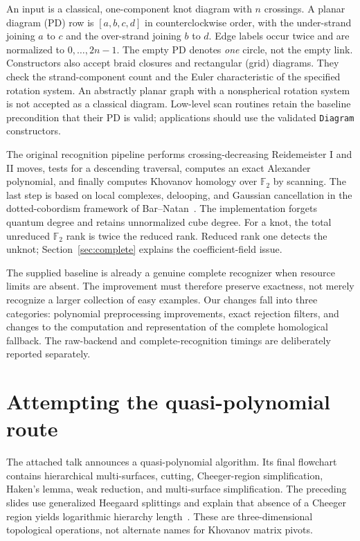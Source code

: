 \documentclass[11pt]{article}
\theoremstyle{definition}\newtheorem{definition}[theorem]{Definition}
\theoremstyle{remark}\newtheorem{remark}[theorem]{Remark}
\newcommand{\F}{\mathbb F_2}
\begin{document}
An input is a classical, one-component knot diagram with $n$ crossings. A planar
diagram (PD) row is $[a,b,c,d]$ in counterclockwise order, with the under-strand
joining $a$ to $c$ and the over-strand joining $b$ to $d$. Edge labels occur twice
and are normalized to $0,\ldots,2n-1$. The empty PD denotes \emph{one} circle,
not the empty link. Constructors also accept braid closures and rectangular
(grid) diagrams. They check the strand-component count and the Euler
characteristic of the specified rotation system. An abstractly planar graph
with a nonspherical rotation system is not accepted as a classical diagram.
Low-level scan routines retain the baseline precondition that their PD is valid;
applications should use the validated \texttt{Diagram} constructors.

The original recognition pipeline performs crossing-decreasing Reidemeister I
and II moves, tests for a descending traversal, computes an exact Alexander
polynomial, and finally computes Khovanov homology over $\F$ by scanning. The
last step is based on local complexes, delooping, and Gaussian cancellation in
the dotted-cobordism framework of Bar--Natan~\cite{BN}. The implementation forgets
quantum degree and retains unnormalized cube degree. For a knot, the total
unreduced $\F$ rank is twice the reduced rank. Reduced rank one detects the
unknot; Section~\ref{sec:complete} explains the coefficient-field issue.

The supplied baseline is already a genuine complete recognizer when resource
limits are absent. The improvement must therefore preserve exactness, not merely
recognize a larger collection of easy examples. Our changes fall into three
categories: polynomial preprocessing improvements, exact rejection filters, and
changes to the computation and representation of the complete homological
fallback. The raw-backend and complete-recognition timings are deliberately
reported separately.

\section{Attempting the quasi-polynomial route}\label{sec:quasi}
The attached talk announces a quasi-polynomial algorithm. Its final flowchart
contains hierarchical multi-surfaces, cutting, Cheeger-region simplification,
Haken's lemma, weak reduction, and multi-surface simplification. The preceding
slides use generalized Heegaard splittings and explain that absence of a
Cheeger region yields logarithmic hierarchy length~\cite{Ltalk}. These are
three-dimensional topological operations, not alternate names for Khovanov
matrix pivots.
\end{document}
